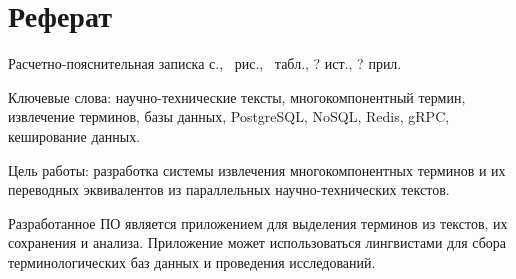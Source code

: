 \section*{Реферат}

Расчетно-пояснительная записка \pageref{LastPage} с., \totalfigures\ рис., \totaltables\ табл., ? ист., ? прил.

Ключевые слова: научно-технические тексты, многокомпонентный термин, извлечение терминов, базы данных, PostgreSQL, NoSQL, Redis, gRPC, кеширование данных.


Цель работы: разработка системы извлечения многокомпонентных терминов и их переводных эквивалентов из параллельных научно-технических текстов.

Разработанное ПО является приложением для выделения терминов из текстов, их сохранения и анализа. Приложение может использоваться лингвистами для сбора терминологических баз данных и проведения исследований.



\pagebreak